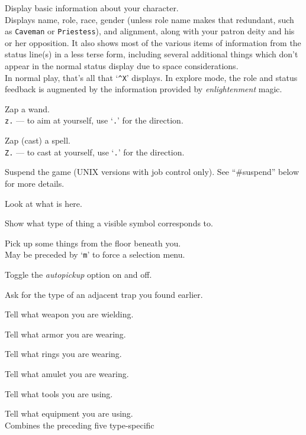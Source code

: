 \item[\tb{\^{}X}]
Display basic information about your character.\\
Displays name, role, race, gender (unless role name makes that
redundant, such as {\tt Caveman} or {\tt Priestess}), and alignment,
along with your patron deity and his or her opposition.  It also
shows most of the various items of information from the status line(s)
in a less terse form, including several additional things which don't
appear in the normal status display due to space considerations.\\
In normal play, that's all that `{\tt \^{}X}' displays.
In explore mode, the role and status feedback is augmented by the
information provided by {\it enlightenment\/} magic.
\item[\tb{z}]
Zap a wand.\\
{\tt z.} --- to aim at yourself, use `{\tt .}' for the direction.
\item[\tb{Z}]
Zap (cast) a spell.\\
{\tt Z.} --- to cast at yourself, use `{\tt .}' for the direction.
\item[\tb{\^{}Z}]
Suspend the game (UNIX versions with job control only).
See ``\#suspend'' below for more details.
\item[\tb{:}]
Look at what is here.
\item[\tb{;}]
Show what type of thing a visible symbol corresponds to.
\item[\tb{,}]
Pick up some things from the floor beneath you.\\
May be preceded by `{\tt m}' to force a selection menu.
\item[\tb{@}]
Toggle the {\it autopickup\/} option on and off.
\item[\tb{\^{}}]
Ask for the type of an adjacent trap you found earlier.
\item[\tb{)}]
Tell what weapon you are wielding.
\item[\tb{[}]
Tell what armor you are wearing.
\item[\tb{=}]
Tell what rings you are wearing.
\item[\tb{"}]
Tell what amulet you are wearing.
\item[\tb{(}]
Tell what tools you are using.
\item[\tb{*}]
Tell what equipment you are using.\\
Combines the preceding five type-specific
